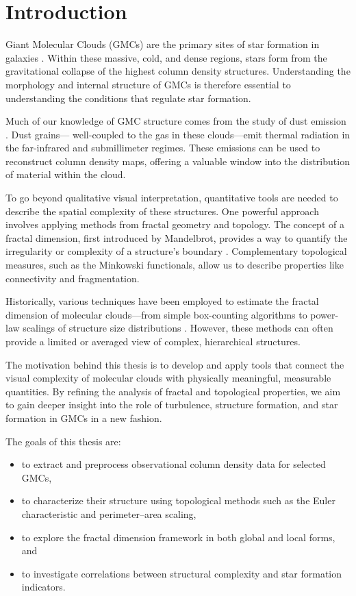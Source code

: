 \chapter{Introduction}

Giant Molecular Clouds (GMCs) are the primary sites of star formation in galaxies \cite{mckee2007theory}. Within these massive, cold, and dense regions, stars form from the gravitational collapse of the highest column density structures. Understanding the morphology and internal structure of GMCs is therefore essential to understanding the conditions that regulate star formation.

Much of our knowledge of GMC structure comes from the study of dust emission \cite{draine2003interstellar}. Dust grains— well-coupled to the gas in these clouds—emit thermal radiation in the far-infrared and submillimeter regimes. These emissions can be used to reconstruct column density maps, offering a valuable window into the distribution of material within the cloud.

To go beyond qualitative visual interpretation, quantitative tools are needed to describe the spatial complexity of these structures. One powerful approach involves applying methods from fractal geometry and topology. The concept of a fractal dimension, first introduced by Mandelbrot, provides a way to quantify the irregularity or complexity of a structure's boundary \cite{cannon1984fractal}. Complementary topological measures, such as the Minkowski functionals, allow us to describe properties like connectivity and fragmentation.

Historically, various techniques have been employed to estimate the fractal dimension of molecular clouds—from simple box-counting algorithms to power-law scalings of structure size distributions \cite{elmegreen1996fractal}. However, these methods can often provide a limited or averaged view of complex, hierarchical structures.

The motivation behind this thesis is to develop and apply tools that connect the visual complexity of molecular clouds with physically meaningful, measurable quantities. By refining the analysis of fractal and topological properties, we aim to gain deeper insight into the role of turbulence, structure formation, and star formation in GMCs in a new fashion.

The goals of this thesis are:
\begin{itemize}
    \item to extract and preprocess observational column density data for selected GMCs,
    \item to characterize their structure using topological methods such as the Euler characteristic and perimeter–area scaling,
    \item to explore the fractal dimension framework in both global and local forms, and
    \item to investigate correlations between structural complexity and star formation indicators.
\end{itemize}

